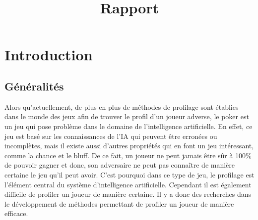 \documentclass{report}
\title{Rapport}
\author{}
\date{}
\begin{document}
\maketitle

\newpage
\null %
\newpage

\tableofcontents %
\newpage

\chapter{Introduction}
\section{Généralités}
\hspace{0.5cm}Alors qu'actuellement, de plus en plus de méthodes de profilage sont établies dans le monde des jeux afin de trouver le profil d'un joueur adverse, le poker est un jeu qui pose problème dans le domaine de l'intelligence artificielle. En effet, ce jeu est basé sur les connaissances de l'IA qui peuvent être erronées ou incomplètes, mais il existe aussi d'autres propriétés qui en font un jeu intéressant, comme la chance et le bluff. De ce fait, un joueur ne peut jamais être sûr à 100\% de pouvoir gagner et donc, son adversaire ne peut pas connaître de manière certaine le jeu qu'il peut avoir. C'est pourquoi dans ce type de jeu, le profilage est l'élément central du système d'intelligence artificielle. Cependant il est également difficile de profiler un joueur de manière certaine. Il y a donc des recherches dans le développement de méthodes permettant de profiler un joueur de manière efficace.\par
\end{document}
